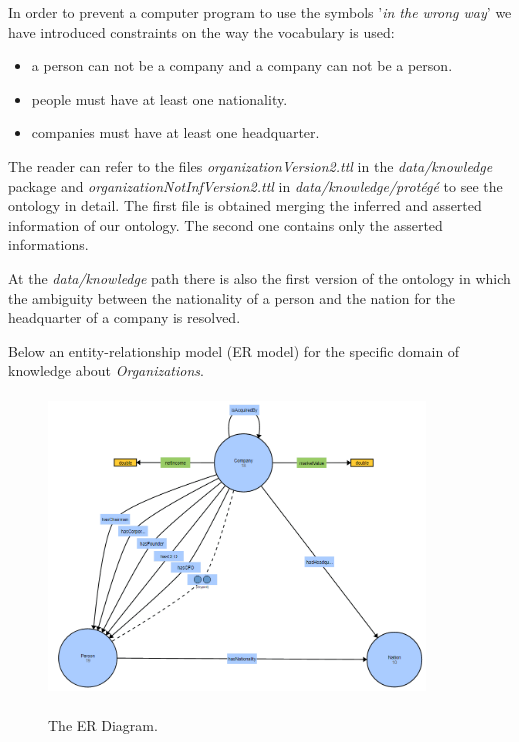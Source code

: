 In order to prevent a computer program to use the symbols '\textit{in the wrong way}' we have introduced  constraints on the way the vocabulary is used:
\begin{itemize}
\item a person can not be a company and a company can not be a person.
\item people must have at least one nationality.
\item companies must have at least one headquarter. 
\end{itemize}

The reader can refer to the files \textit{organizationVersion2.ttl} in the \textit{data/knowledge} package and \textit{organizationNotInfVersion2.ttl} in \textit{data/knowledge/protégé} to see the ontology in detail. The first file is obtained merging the inferred and asserted information of our ontology. The second one contains only the asserted informations.  

At the \textit{data/knowledge} path there is also the first version of the ontology in which the ambiguity between the nationality of a person and the nation for the headquarter of a company is resolved.

Below an entity-relationship model (ER model) for the specific domain of knowledge about \textit{Organizations}.
\begin{figure}[H]
\centering
\includegraphics[width=10cm, height=8cm]{fig/ERDiagram.png}
\label{fig:ontology}
    \caption{The ER Diagram.}
\end{figure}

